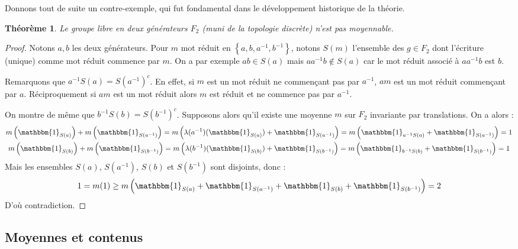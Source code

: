 \documentclass[a4paper,12pt]{article}
\newtheorem{theorem}{Théorème}[section]
\newcommand{\set}[1]{\left\{ #1 \right\}}
\newcommand{\indic}{\mathbbm{1}}
\newcommand{\inv}{^{-1}}
\newcommand{\compl}{^c}
\newcommand{\TODO}[1]{}%
\begin{document}
Donnons tout de suite un contre-exemple, qui fut fondamental dans le développement historique de la théorie.

\begin{theorem}\label{not_amenable_F2}
    Le groupe libre en deux générateurs $F_2$ (muni de la topologie discrète) n'est pas moyennable.
\end{theorem}

\begin{proof}
    Notons $a, b$ les deux générateurs. Pour $m$ mot réduit en $\set{a, b, a\inv, b\inv}$, notons 
    $S(m)$ l'ensemble des $g\in F_2$ dont l'écriture (unique) comme mot réduit
    commence par $m$. On a par exemple $ab\in S(a)$ mais $a a\inv b \notin S(a)$ car le mot réduit associé 
    à $a a\inv b$ est $b$.

    Remarquons que $a\inv S(a) = S(a\inv)\compl$. En effet, si $m$ est un mot réduit ne commençant pas par $a\inv$, 
    $am$ est un mot réduit commençant par $a$. Réciproquement si $am$ est un mot réduit alors $m$ est réduit et ne commence 
    pas par $a\inv$.

    On montre de même que $b\inv S(b) = S(b\inv)\compl$. Supposons alors qu'il existe une moyenne $m$ sur 
    $F_2$ invariante par translations. On a alors :
    \begin{gather*}
        m\left(\indic_{S(a)}\right) + m\left(\indic_{S(a\inv)}\right) = m\left(\lambda(a\inv)(\indic_{S(a)}) + \indic_{S(a\inv)}\right) = m\left(\indic_{a\inv S(a)} + \indic_{S(a\inv)}\right) = 1 \\
        m\left(\indic_{S(b)}\right) + m\left(\indic_{S(b\inv)}\right) = m\left(\lambda(b\inv)(\indic_{S(b)}) + \indic_{S(b\inv)}\right) = m\left(\indic_{b\inv S(b)} + \indic_{S(b\inv)}\right) = 1 \\
    \end{gather*}
    Mais les ensembles $S(a)$, $S(a\inv)$, $S(b)$ et $S(b\inv)$ sont disjoints, donc :
    \begin{equation*}
        1 = m(1) \ge m\left(\indic_{S(a)} + \indic_{S(a\inv)} + \indic_{S(b)} + \indic_{S(b\inv)}\right) = 2
    \end{equation*} 
    D'où contradiction.
\end{proof}

\TODO{Mentionner importance historique ?}

\subsection{Moyennes et contenus}
\end{document}
